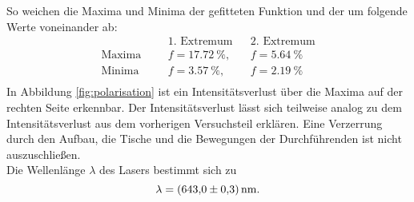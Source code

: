 So weichen die Maxima und Minima der gefitteten Funktion und der um folgende Werte voneinander ab:
\begin{align*}
              &&& \text{1. Extremum}  && \text{2. Extremum}    \\
\text{Maxima} &&& f=\SI{17.72}{\%},   && f=\SI{5.64}{\%} \\
\text{Minima} &&& f=\SI{3.57}{\%},    && f=\SI{2.19}{\%} \\
\end{align*}
In Abbildung \ref{fig:polarisation} ist ein Intensitätsverlust über die Maxima auf der rechten Seite erkennbar.
Der Intensitätsverlust lässt sich teilweise analog zu dem Intensitätsverlust aus dem vorherigen Versuchsteil erklären.
Eine Verzerrung durch den Aufbau, die Tische und die Bewegungen der Durchführenden ist nicht auszuschließen.\\
Die Wellenlänge $\lambda$ des Lasers bestimmt sich zu
\begin{equation*}
  \lambda=\SI{643.0 \pm 0.3}{nm}.
\end{equation*}
